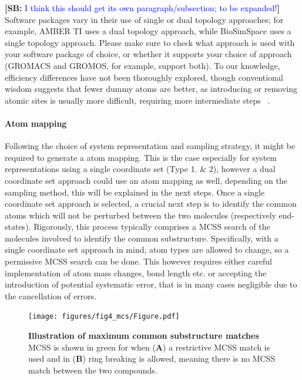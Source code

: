 \documentclass[9pt,bestpractices]{livecoms}
\newcommand{\sbnote}[1]{%
  {\bfseries{}[SB: }%
  {\textcolor{blue}{#1}}{\bfseries{}]}
}
\begin{document}
\sbnote{I think this should get its own paragraph/subsection; to be expanded!} Software packages vary in their use of single or dual topology approaches; for example, AMBER TI uses a dual topology approach, while BioSimSpace uses a single topology approach. Please make sure to check what approach is used with your software package of choice, or whether it supports your choice of approach (GROMACS and GROMOS, for example, support both). 
To our knowledge, efficiency differences have not been thoroughly explored, though conventional wisdom suggests that fewer dummy atoms are better, as introducing or removing atomic sites is usually more difficult, requiring more intermediate steps ~\cite{liu2013lead, mobley2012perspective}.

\paragraph{Atom mapping}
Following the choice of system representation and sampling strategy, it might be required to generate a atom mapping. This is the case especially for system representations using a single coordinate set (Type 1. \& 2), however a dual coordinate set approach could use an atom mapping as well, depending on the sampling method, this will be explained in the next steps.
Once a single coordinate set approach is selected, a crucial next step is to identify the common atoms which will not be perturbed between the two molecules (respectively end-states).
Rigorously, this process typically comprises a MCSS search of the molecules involved to identify the common substructure.
Specifically, with a single coordinate set approach in mind, atom types are allowed to change, so a permissive MCSS search can be done. This however requires either careful implementation of atom mass changes, bond length etc. or accepting the introduction of potential systematic error, that is in many cases negligible due to the cancellation of errors. \cite{ries2024kartograf}

\begin{figure}
    \texttt{[image: figures/fig4\_mcs/Figure.pdf]}
    \caption{\textbf{Illustration of maximum common substructure matches} MCSS is shown in green for when (\textbf{A}) a restrictive MCSS match is used and in (\textbf{B}) ring breaking is allowed, meaning there is no MCSS match between the two compounds.}
    \label{fig:fig_mcss}
\end{figure} 
\end{document}
